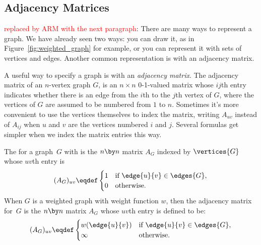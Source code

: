 \begin{editingnotes}
\subsection{Adjacency Matrices}

  \textcolor{red}{replaced by ARM with the next paragraph}: There are many
  ways to represent a graph.  We have already seen two ways: you can draw
  it, as in Figure~\ref{fig:weighted_graph} for example, or you can
  represent it with sets of vertices and edges.  Another common
  representation is with an adjacency matrix.

A useful way to specify a graph is with an \emph{adjacency matrix}.  The
adjacency matrix of an $n$-vertex graph $G$, is an $n \times n$ 0-1-valued
matrix whose $ij$th entry indicates whether there is an edge from the
$i$th to the $j$th vertex of $G$, where the vertices of $G$ are assumed to
be numbered from $1$ to $n$.  Sometimes it's more convenient to use the
vertices themselves to index the matrix, writing $A_{uv}$ instead of
$A_{ij}$ when $u$ and $v$ are the vertices numbered $i$ and $j$.  Several
formulas get simpler when we index the matrix entries this way.

\begin{definition}\label{def:adjacency_matrix}
The  for a graph~$G$ with
is the $n \by n$ matrix $A_G$  indexed by $\vertices{G}$ whose $uv$th entry is
\begin{equation*}
    (A_G)_{uv} \eqdef \begin{cases}
                1 & \text{if $\edge{u}{v} \in \edges{G}$}, \\
                0 & \text{otherwise.}
              \end{cases}
\end{equation*}
When $G$ is a weighted graph with weight function $w$, then the adjacency
matrix for~$G$ is the $n \by n$ matrix $A_G$ whose $uv$th entry is defined
to be:
\begin{equation*}
      (A_G)_{uv} \eqdef \begin{cases}
                w(\edge{u}{v}) & \text{if $\edge{u}{v} \in \edges{G}$}, \\
                \infty         & \text{otherwise.}
              \end{cases}
\end{equation*}
\end{definition}


\end{editingnotes}
